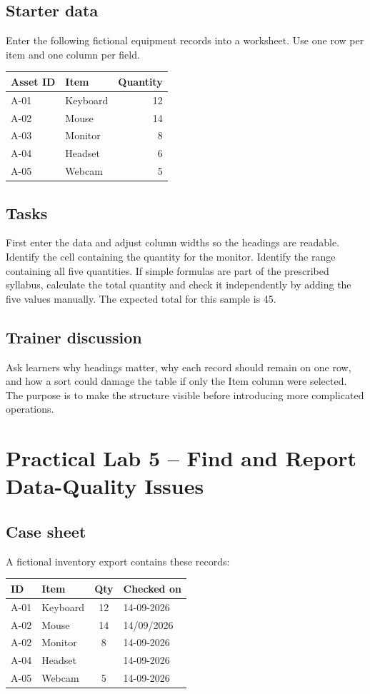 \documentclass[11pt,openany,oneside]{book}
\begin{document}
\section{Starter data}
Enter the following fictional equipment records into a worksheet. Use one row per item and one column per field.
\begin{center}\small\begin{tabularx}{.94\textwidth}{|l|X|r|}\hline
\textbf{Asset ID} & \textbf{Item} & \textbf{Quantity}\\\hline
A-01 & Keyboard & 12\\\hline
A-02 & Mouse & 14\\\hline
A-03 & Monitor & 8\\\hline
A-04 & Headset & 6\\\hline
A-05 & Webcam & 5\\\hline
\end{tabularx}\end{center}
\section{Tasks}
First enter the data and adjust column widths so the headings are readable. Identify the cell containing the quantity for the monitor. Identify the range containing all five quantities. If simple formulas are part of the prescribed syllabus, calculate the total quantity and check it independently by adding the five values manually. The expected total for this sample is 45.
\section{Trainer discussion}
Ask learners why headings matter, why each record should remain on one row, and how a sort could damage the table if only the Item column were selected. The purpose is to make the structure visible before introducing more complicated operations.

\chapter{Practical Lab 5 -- Find and Report Data-Quality Issues}
\section{Case sheet}
A fictional inventory export contains these records:
\begin{center}\small\begin{tabularx}{.96\textwidth}{|l|X|c|l|}\hline
\textbf{ID} & \textbf{Item} & \textbf{Qty} & \textbf{Checked on}\\\hline
A-01 & Keyboard & 12 & 14-09-2026\\\hline
A-02 & Mouse & 14 & 14/09/2026\\\hline
A-02 & Monitor & 8 & 14-09-2026\\\hline
A-04 & Headset &  & 14-09-2026\\\hline
A-05 & Webcam & 5 & 14-09-2026\\\hline
\end{tabularx}\end{center}
\end{document}
